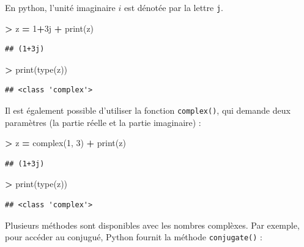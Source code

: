 \documentclass[12pt,]{book}
\newenvironment{Shaded}{\begin{snugshade}}{\end{snugshade}}
\newcommand{\DecValTok}[1]{\textcolor[rgb]{0.00,0.00,0.81}{#1}}
\newcommand{\OperatorTok}[1]{\textcolor[rgb]{0.81,0.36,0.00}{\textbf{#1}}}
\newcommand{\BuiltInTok}[1]{#1}
\newcommand{\NormalTok}[1]{#1}
\numberwithin{equation}{section}
\numberwithin{countremarque}{section}
\begin{document}
En python, l'unité imaginaire \(i\) est dénotée par la lettre
\texttt{j}.

\begin{Shaded}
\begin{Highlighting}[]
\OperatorTok{>}\NormalTok{ z }\OperatorTok{=} \DecValTok{1}\OperatorTok{+}\NormalTok{3j}
\OperatorTok{+} \BuiltInTok{print}\NormalTok{(z)}
\end{Highlighting}
\end{Shaded}

\begin{lstlisting}
## (1+3j)
\end{lstlisting}

\begin{Shaded}
\begin{Highlighting}[]
\OperatorTok{>} \BuiltInTok{print}\NormalTok{(}\BuiltInTok{type}\NormalTok{(z))}
\end{Highlighting}
\end{Shaded}

\begin{lstlisting}
## <class 'complex'>
\end{lstlisting}

Il est également possible d'utiliser la fonction \texttt{complex()}, qui
demande deux paramètres (la partie réelle et la partie imaginaire) :

\begin{Shaded}
\begin{Highlighting}[]
\OperatorTok{>}\NormalTok{ z }\OperatorTok{=} \BuiltInTok{complex}\NormalTok{(}\DecValTok{1}\NormalTok{, }\DecValTok{3}\NormalTok{)}
\OperatorTok{+} \BuiltInTok{print}\NormalTok{(z)}
\end{Highlighting}
\end{Shaded}

\begin{lstlisting}
## (1+3j)
\end{lstlisting}

\begin{Shaded}
\begin{Highlighting}[]
\OperatorTok{>} \BuiltInTok{print}\NormalTok{(}\BuiltInTok{type}\NormalTok{(z))}
\end{Highlighting}
\end{Shaded}

\begin{lstlisting}
## <class 'complex'>
\end{lstlisting}

Plusieurs méthodes sont disponibles avec les nombres complèxes. Par
exemple, pour accéder au conjugué, Python fournit la méthode
\texttt{conjugate()} :
\end{document}
